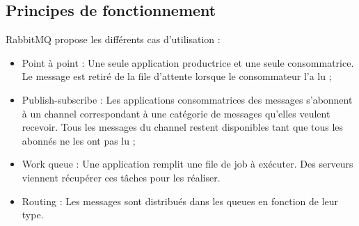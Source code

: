 \subsection{Principes de fonctionnement}

RabbitMQ propose les différents cas d'utilisation :

\begin{itemize}
	\item Point à point : Une seule application productrice et une seule consommatrice. Le message est retiré de la file d’attente lorsque le consommateur l’a lu ;
	\item Publish-subscribe : Les applications consommatrices des messages s'abonnent à un channel correspondant à une catégorie de messages qu’elles veulent recevoir. Tous les messages du channel restent disponibles tant que tous les abonnés ne les ont pas lu ;
	\item Work queue : Une application remplit une file de job à exécuter. Des serveurs viennent récupérer ces tâches pour les réaliser.
	\item Routing : Les messages sont distribués dans les queues en fonction de leur type.
\end{itemize}
